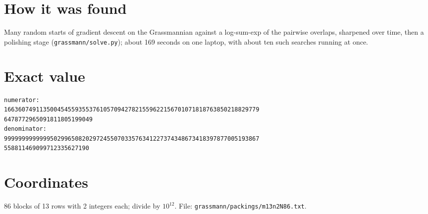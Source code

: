 \documentclass[11pt,a4paper]{article}
\begin{document}
\section{How it was found}
Many random starts of gradient descent on the Grassmannian against a log-sum-exp of the pairwise overlaps, sharpened over time, then a polishing stage (\texttt{grassmann/solve.py}); about 169 seconds on one laptop, with about ten such searches running at once.


\appendix
\section{Exact value}
{\small
\begin{verbatim}
numerator:
166360749113500454559355376105709427821559622156701071818763850218829779
6478772965091811805199049
denominator:
999999999999950299650820297245507033576341227374348673418397877005193867
558811469099712335627190
\end{verbatim}}

\section{Coordinates}
86 blocks of 13 rows with 2 integers each; divide by $10^{12}$. File: \texttt{grassmann/packings/m13n2N86.txt}.
{\tiny
\begin{multicols}{4}
\end{multicols}}
\end{document}

